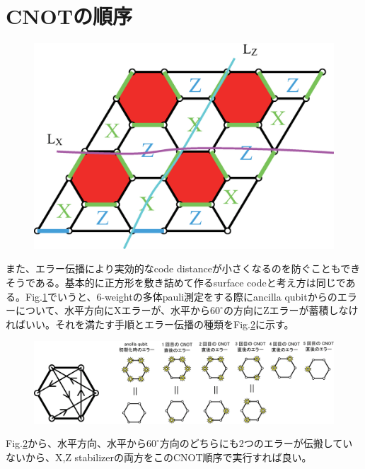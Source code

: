 \documentclass[a4paper,10pt]{ltjsarticle}
\begin{document}
\section{CNOTの順序}{

    \begin{figure}[h]
        \centering
        \includegraphics[scale=0.25]{figure/figure11.eps}
        \caption{ }
        \label{figure11}
    \end{figure}

    また、エラー伝播により実効的なcode distanceが小さくなるのを防ぐこともできそうである。基本的に正方形を敷き詰めて作るsurface codeと考え方は同じである。Fig.\ref{figure11}でいうと、6-weightの多体pauli測定をする際にancilla qubitからのエラーについて、水平方向にXエラーが、水平から$60^\circ$の方向にZエラーが蓄積しなければいい。それを満たす手順とエラー伝播の種類をFig.\ref{figure12}に示す。

    \begin{figure}[h]
        \centering
        \includegraphics[scale=0.25]{figure/figure12.eps}
        \caption{ }
        \label{figure12}
    \end{figure}

    Fig.\ref{figure12}から、水平方向、水平から$60^\circ$方向のどちらにも2つのエラーが伝搬していないから、X,Z stabilizerの両方をこのCNOT順序で実行すれば良い。
}
\clearpage
\end{document}
